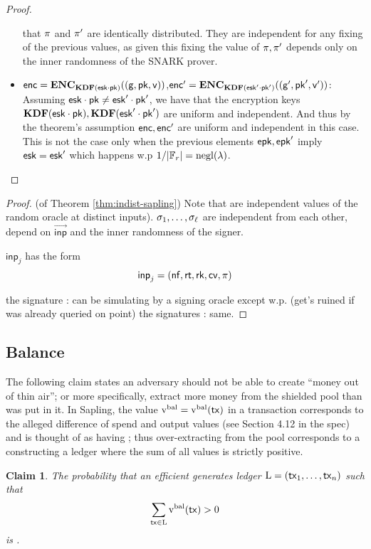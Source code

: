 \documentclass[11pt]{article}
\numberwithin{equation}{section} %
\numberwithin{figure}{section} %
\newtheorem{claim}[thm]{Claim}
\newcommand{\inp}{\ensuremath{\mathsf{inp}}\xspace}
\newcommand{\inps}{\ensuremath{\overrightarrow{\mathsf{inp}}}\xspace}
\newcommand{\out}{\ensuremath{\mathsf{out}}\xspace}
\newcommand{\set}[1]{\ensuremath{\left\{#1\right\}}\xspace}
\begin{document}
\begin{proof}
\begin{itemize}
  that $\pi$ and $\pi'$ are identically distributed. They are independent for any fixing of the previous values, as given this fixing the value
  of $\pi,\pi'$ depends only on the inner randomness of the SNARK prover.
  \item $\mathsf{enc} = \mathbf{ENC}_{\mathbf{KDF}(\mathsf{esk}\cdot\mathsf{pk})}((\mathsf{g},\mathsf{pk},\mathsf{v}))$,$\mathsf{enc}' = \mathbf{ENC}_{\mathbf{KDF}(\mathsf{esk}'\cdot\mathsf{pk}')}((\mathsf{g}',\mathsf{pk}',\mathsf{v}'))$:
 Assuming $\mathsf{esk}\cdot \mathsf{pk}\neq \mathsf{esk}'\cdot \mathsf{pk}'$, we have that the encryption keys $\mathbf{KDF}(\mathsf{esk}\cdot\mathsf{pk}),\mathbf{KDF}(\mathsf{esk}'\cdot\mathsf{pk}')$ are uniform and independent.
 And thus by the theorem's assumption $\mathsf{enc},\mathsf{enc}'$ are uniform and independent in this case. This is not the case only when the previous elements
 $\mathsf{epk},\mathsf{epk}'$ imply $\mathsf{esk}=\mathsf{esk}'$ which happens w.p $1/|{\mathbb F}_r| = \mathrm{negl}(\lambda)$.
  \end{itemize}
\end{proof}




\begin{proof} (of Theorem \ref{thm:indist-sapling})
Note that 
are independent values of the random oracle \NF at distinct inputs).
$\sigma_1,\ldots,\sigma_\ell$ are independent from each other, depend on \inps and the inner randomness of the signer.


$\inp_j$ has the form
\[\inp_j = (\nf,\rt,\rk,\cv,\prf)\]

  

the signature \sigval: can be simulating by a signing oracle except w.p. \negl (get's ruined if \RO was already queried on point)
the signatures \sigs: same.
\end{proof}
\newcommand{\inpwitness}{\ensuremath{\mathsf{inpwit}}\xspace}
\newcommand{\inpnote}{\ensuremath{\mathsf{inpnote}}\xspace}
\newcommand{\posnote}{\ensuremath{\mathsf{posnote}}\xspace}
\newcommand{\inpnotes}{\ensuremath{{\mathcal{I}}}\xspace}
\newcommand{\outnotes}{\ensuremath{{\mathcal{O}}}\xspace}
\newcommand{\outwitness}{\ensuremath{\mathsf{outwit}}\xspace}
\newcommand{\outnote}{\ensuremath{\mathsf{outnote}}\xspace}
\newcommand{\treehash}{\ensuremath{\mathsf{treehash}}\xspace}
\subsection{Balance}
The following claim states an adversary should not be able to create ``money out of thin air'';
or more specifically, extract more money from the shielded pool than was put in it.
In Sapling, the value $\mathrm{v^{bal}}=\mathrm{v^{bal}}(\mathsf{tx})$ in a transaction \tx corresponds to the alleged difference of spend and output values (see Section 4.12 in the spec) and \tx is thought of as having  ;
thus over-extracting from the pool corresponds to a constructing a ledger where the sum of all \vbal values is strictly positive.
\begin{claim}\label{clm:balance-sapling}
 The probability that an efficient \adv generates ledger $\mathrm{L}=(\mathsf{tx}_1,\ldots,\mathsf{tx}_n)$ such that
 \[\sum_{\mathsf{tx}\in \mathrm{L}} \mathrm{v^{bal}}(\mathsf{tx}) >0 \]
 is \negl.
\end{claim}
\end{document}
